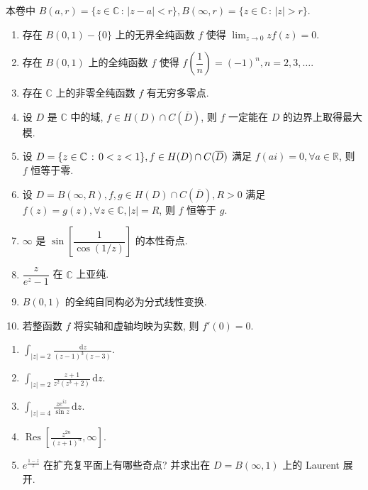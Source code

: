 \documentclass[simple]{hfutexam}
\newcommand{\BC}{\mathbb{C}}
\newcommand{\BR}{\mathbb{R}}
\newcommand{\ra}{\rightarrow}
\let\Re\relax
\DeclareMathOperator\Re{Re}
\DeclareMathOperator\Res{Res}
\newcommand{\diff}{\, \mathrm{d}}
\renewcommand{\mid}{\,:\,}
\let\Re\relax\DeclareMathOperator{\Re}{Re}
\begin{document}
\maketitle

\begin{center}
本卷中 $B(a, r)=\{z\in\BC\mid|z-a|<r\}, B(\infty, r)=\{z\in\BC\mid|z|>r\}$.
\end{center}


\begin{enumerate}
\item 存在 $B(0, 1)-\{0\}$ 上的无界全纯函数 $f$ 使得 $\displaystyle\lim_{z\ra 0}zf(z)=0$.
\item 存在 $B(0, 1)$ 上的全纯函数 $f$ 使得 $f\left(\dfrac1n\right)=(-1)^n, n=2, 3, \dots$.
\item 存在 $\BC$ 上的非零全纯函数 $f$ 有无穷多零点.
\item 设 $D$ 是 $\BC$ 中的域, $f\in H(D)\cap C(\overline D)$, 则 $f$ 一定能在 $D$ 的边界上取得最大模.
\item 设 $D=\{z\in\BC\mid0<\Re z<1\}, f\in H(D)\cap C(\overline D)$ 满足 $f(ai)=0, \forall a\in\BR$, 则 $f$ 恒等于零.
\item 设 $D=B(\infty, R), f, g\in H(D)\cap C(\overline D), R>0$ 满足 $f(z)=g(z), \forall z\in\BC, |z|=R$, 则 $f$ 恒等于 $g$.
\item $\infty$ 是 $\sin\left[\dfrac1{\cos(1/z)}\right]$ 的本性奇点.
\item $\dfrac{z}{e^z-1}$ 在 $\BC$ 上亚纯.
\item $B(0, 1)$ 的全纯自同构必为分式线性变换.
\item 若整函数 $f$ 将实轴和虚轴均映为实数, 则 $f'(0)=0$.
\end{enumerate}


\begin{enumerate}
\item $\displaystyle\int_{|z|=2}\frac{\diff z}{(z-1)^3(z-3)}$.
\item $\displaystyle\int_{|z|=2}\frac{z+1}{z^2(z^3+2)}\diff z$.
\item $\displaystyle\int_{|z|=4}\frac{ze^{iz}}{\sin z}\diff z$.
\item $\displaystyle\Res\left[\frac{z^{2n}}{(z+1)^n}, \infty\right]$.
\item $e^{\frac{1-z}{z}}$ 在扩充复平面上有哪些奇点? 并求出在 $D=B(\infty, 1)$ 上的 Laurent 展开.
\end{enumerate}
\end{document}
